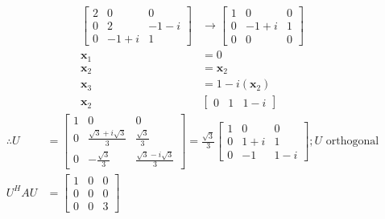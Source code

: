 \documentclass[12pt, a4paper]{scrartcl}
\begin{document}
\begin{enumerate}
\begin{enumerate}
\begin{align*}
                    \begin{bmatrix}
                        2&0&0\\0&2&-1-i\\0&-1+i&1
                    \end{bmatrix} &\to \begin{bmatrix}
                        1&0&0\\0&-1+i&1\\0&0&0
                    \end{bmatrix}
                    \\ \textbf{x}_1&=0
                    \\ \textbf{x}_2&=\textbf{x}_2
                    \\ \textbf{x}_3&=1-i(\textbf{x}_2)
                    \\ \textbf{x}_2&\begin{bmatrix}
                        0&1&1-i
                    \end{bmatrix}
                \end{align*}
                \begin{align*}
                    \therefore U &=\begin{bmatrix}
                        1&0&0\\0&\frac{\sqrt{3}+i\sqrt{3}}{3}&\frac{\sqrt{3}}{3}\\0&-\frac{\sqrt{3}}{3}&\frac{\sqrt{3}-i\sqrt{3}}{3}
                    \end{bmatrix} = \frac{\sqrt{3}}{3}\begin{bmatrix}
                        1&0&0\\0&1+i&1\\0&-1&1-i
                    \end{bmatrix}; U \mbox{ orthogonal}
                    \\ U^HAU&=\begin{bmatrix}
                        1&0&0\\0&0&0\\0&0&3
                    \end{bmatrix}
                \end{align*}

            \end{enumerate}
        \end{enumerate}
\end{document}

